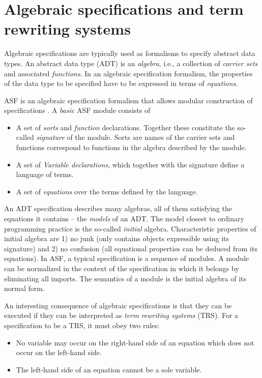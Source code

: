 \section{\label{AlgSpec}Algebraic specifications and term rewriting systems}


Algebraic specifications are typically used as formalisms to
specify abstract data types. An abstract data type (ADT) is an
{\em algebra}, i.e., a collection of {\em carrier sets}
and associated {\em functions}. 
In an algebraic specification formalism, the properties of the data type to
be specified have to be expressed in terms of {\em equations}. 

ASF is an algebraic specification formalism that allows modular
construction of specifications \cite{BHK89}. 
A {\em basic} ASF module consists of
\begin{itemize}
\item 
      A set of {\em sorts} and {\em function} declarations.
      Together these constitute the so-called {\em signature} of
      the module. Sorts are names of the carrier sets and functions
      correspond to functions in the algebra described by the module.
\item 
      A set of {\em Variable declarations}, which together with the
      signature define a language of terms.
\item 
      A set of {\em equations} over the terms defined by the language.
\end{itemize}
An ADT specification describes many algebras, all
of them satisfying the equations it contains -- the {\em models} of an ADT.
The model closest to ordinary programming practice is the so-called
{\em initial} algebra. Characteristic properties of initial algebra 
are 1) no junk (only contains objects expressible using its signature)
and 2) no confusion (all equational properties can be deduced from
its equations).
In ASF, a typical specification is a sequence of modules. A module
can be normalized in the context of the specification in which it 
belongs by eliminating all imports. The semantics of a module is
the initial algebra of its normal form.


An interesting consequence of algebraic specifications is that
they can be executed if they can be interpreted as {\em term
rewriting systems} (TRS). For a specification to be a TRS, it
must obey two rules:
\begin{itemize}
\item 
      No variable may occur on the right-hand side of an equation
      which does not occur on the left-hand side.
\item
      The left-hand side of an equation cannot be a sole variable.
\end{itemize}

